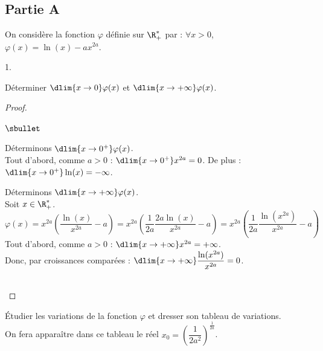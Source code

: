 \documentclass[11pt]{article}%
\begin{document}
\subsection*{Partie A}
\noindent
On considère la fonction $\varphi$ définie sur $\R_+^*$ par : $\forall 
x>0$, $\varphi(x)=\ln(x)-ax^{2a}$.
\begin{noliste}{1.}
\item Déterminer $\dlim{x\to 0} \varphi(x)$ et $\dlim{x\to+\infty}
  \varphi(x)$.

  \begin{proof}~
    \begin{noliste}{$\sbullet$}
    \item Déterminons $\dlim{x\to 0^+} \varphi(x)$.\\[.2cm]
      Tout d'abord, comme $a>0$ : $\dlim{x\to 0^+} x^{2a}=0$. De 
      plus : $\dlim{x\to 0^+}\ln(x)=-\infty$.
    \item Déterminons $\dlim{x\to+\infty} \varphi(x)$.\\[.2cm]
      Soit $x\in\R_+^*$. 
      \[
      \varphi(x)=x^{2a}\left(\dfrac{\ln(x)}{x^{2a}}-a\right) = x^{2a} \left(
        \dfrac{1}{2a} \dfrac{2a\ln(x)}{x^{2a}} -a\right)=x^{2a} \left(
        \dfrac{1}{2a}\dfrac{\ln(x^{2a})}{x^{2a}}-a\right)
      \]
      Tout d'abord, comme $a>0$ : $\dlim{x\to+\infty} x^{2a}=+\infty$.\\
      Donc, par croissances comparées : 
      $\dlim{x\to+\infty}\dfrac{\ln(x^{2a})}{x^{2a}}=0$.\\[.2cm]
      ~\\[-1.4cm]
    \end{noliste}
  \end{proof}
  
\item Étudier les variations de la fonction $\varphi$ et dresser son
  tableau de variations.\\
  On fera apparaître dans ce tableau le réel $x_0 =
  \left(\dfrac{1}{2a^2}\right)^{\frac{1}{2a}}$.


\end{noliste}
\end{document}
